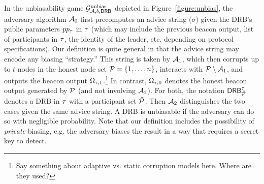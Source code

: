 In the unbiasability game $\mathcal{G}^\text{unbias}_{\mathcal{A}, b, \mathsf{DRB}}$ depicted in Figure~\ref{figure:unbias}, the adversary algorithm $\mathcal{A}_0$ first precomputes an advice string ($\sigma$) given the DRB's public parameters $pp_\tau$ in \epoch $\tau$ (which may include the previous beacon output, list of participants in \epoch $\tau$, the identity of the \epoch leader, etc. depending on protocol specifications).
Our definition is quite general in that the advice string may encode any biasing ``strategy.'' This string is taken by $\mathcal{A}_1$, which then corrupts up to $t$ nodes in the honest node set $\mathcal{P} = \{1, \dots, n\}$, interacts with $\mathcal{P}\setminus\mathcal{A}_1$, and outputs the beacon output $\Omega_{\tau, 1}$.\footnote{Say something about adaptive vs. static corruption models here. Where are they used?}
In contrast, $\Omega_{\tau, 0}$ denotes the honest beacon output generated by $\mathcal{P}$ (and not involving $\mathcal{A}_1$).
For both, the notation $\mathsf{DRB}^\tau_{\tilde{\mathcal{P}}}$ denotes a DRB in \epoch $\tau$ with a participant set $\tilde{\mathcal{P}}$.
Then $\mathcal{A}_2$ distinguishes the two cases given the same advice string.
A DRB is unbiasable if the adversary can do so with negligible probability.
Note that our definition includes the possibility of \emph{private} biasing, e.g. the adversary biases the result in a way that requires a secret key to detect.



